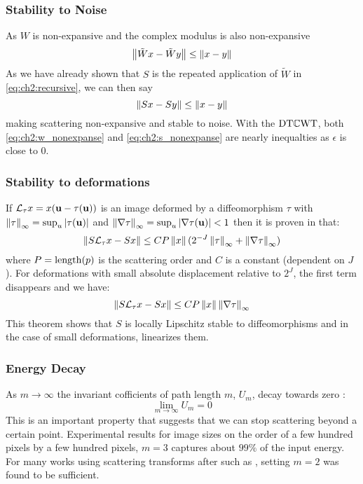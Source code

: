 \subsubsection{Stability to Noise}
As $W$ is non-expansive and the complex modulus is also non-expansive
\begin{equation}
  \left\lVert \tilde{W}x - \tilde{W}y \right\rVert \leq \left\lVert x-y \right\rVert \label{eq:ch2:w_nonexpanse}
\end{equation}
As we have already shown that $S$ is the repeated application of $\tilde{W}$ in
\eqref{eq:ch2:recursive}, we can then say
\begin{equation}
  \left\lVert Sx - Sy \right\rVert \leq \left\lVert x-y \right\rVert\label{eq:ch2:s_nonexpanse}
\end{equation}
making scattering non-expansive and stable to noise. With the $\mathrm{DT}\mathbb{C}\mathrm{WT}$, both
\eqref{eq:ch2:w_nonexpanse} and \eqref{eq:ch2:s_nonexpanse} are nearly
inequalties as $\epsilon$ is close to 0.

\subsubsection{Stability to deformations}
If $\mathcal{L}_\tau x = x(\mathbf{u} -\tau(\mathbf{u}))$ is an image deformed 
by a diffeomorphism $\tau$ with $\left\lVert \tau \right\rVert_\infty = \sup_u |\tau(\mathbf{u})|$
and $\left\lVert \nabla \tau \right\rVert_\infty = \sup_u |\nabla \tau(\mathbf{u})| < 1$ then it is
proven in \cite{mallat_group_2012} that:
%
\begin{equation}
  \left\lVert  S \mathcal{L}_{\tau}x  - S x \right\rVert \leq C P \left\lVert x \right\rVert
  (2^{-J}\left\lVert \tau \right\rVert_\infty + \left\lVert \nabla \tau \right\rVert_\infty ) 
\end{equation}
%
where $P = \mathrm{length}(p)$ is the scattering order and $C$ is a constant
(dependent on $J$). For deformations with small absolute displacement relative
to $2^J$, the first term disappears and we have:
\begin{equation}
  \left\lVert  S \mathcal{L}_{\tau}x  - S x \right\rVert \leq C P \left\lVert x \right\rVert \left\lVert \nabla \tau \right\rVert_\infty  \label{eq:ch2:stability}
\end{equation}
This theorem shows that $S$ is locally Lipschitz stable to diffeomorphisms and in
the case of small deformations, linearizes them.

\subsubsection{Energy Decay}
As $m \rightarrow \infty$ the invariant cofficients of path length $m$, $U_m$,
decay towards zero \cite{mallat_group_2012}:
\begin{equation}
  \lim_{m \rightarrow \infty} U_m = 0
\end{equation}
This is an important property that suggests that we can stop scattering beyond a
certain point. Experimental results \cite{bruna_invariant_2013} for 
image sizes on the order of a few hundred pixels by a few
hundred pixels, $m=3$ captures about $99\%$ of the input energy. For many works
using scattering transforms after \cite{bruna_invariant_2013} such as
\cite{oyallon_deep_2015, oyallon_hybrid_2017, oyallon_scaling_2017}, setting
$m=2$ was found to be sufficient.

